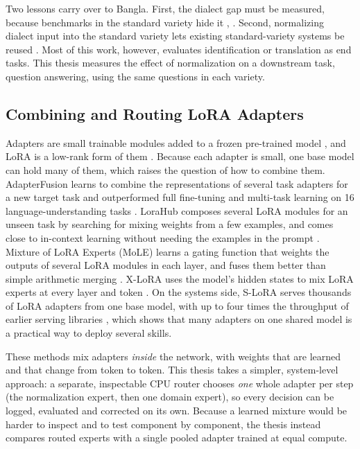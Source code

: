 Two lessons carry over to Bangla. First, the dialect gap must be
measured, because benchmarks in the standard variety hide it
\cite{faisal2024dialectbench}, \cite{kantharuban2023dialectgap}. Second,
normalizing dialect input into the standard variety lets existing
standard-variety systems be reused \cite{honnet2018swissgerman}. Most of
this work, however, evaluates identification or translation as end
tasks. This thesis measures the effect of normalization on a downstream
task, question answering, using the same questions in each variety.

\subsection{Combining and Routing LoRA Adapters}\label{combining-and-routing-lora-adapters}

Adapters are small trainable modules added to a frozen pre-trained model
\cite{houlsby2019adapters}, and LoRA is a low-rank form of them
\cite{hu2022lora}. Because each adapter is small, one base model can hold
many of them, which raises the question of how to combine them.
AdapterFusion learns to combine the representations of several
task adapters for a new target task and outperformed full fine-tuning
and multi-task learning on 16 language-understanding tasks
\cite{pfeiffer2021adapterfusion}. LoraHub composes several LoRA modules
for an unseen task by searching for mixing weights from a few examples,
and comes close to in-context learning without needing the examples in
the prompt \cite{huang2024lorahub}. Mixture of LoRA Experts (MoLE) learns a
gating function that weights the outputs of several LoRA modules in each
layer, and fuses them better than simple arithmetic merging
\cite{wu2024mole}. X-LoRA uses the model's hidden states to mix LoRA
experts at every layer and token \cite{buehler2024xlora}. On the systems side,
S-LoRA serves thousands of LoRA adapters from one base model, with up to
four times the throughput of earlier serving libraries
\cite{sheng2024slora}, which shows that many adapters on one shared model
is a practical way to deploy several skills.

These methods mix adapters \emph{inside} the network, with weights that
are learned and that change from token to token. This thesis takes a
simpler, system-level approach: a separate, inspectable CPU router
chooses \emph{one} whole adapter per step (the normalization expert, then
one domain expert), so every decision can be logged, evaluated and
corrected on its own. Because a learned mixture would be harder to
inspect and to test component by component, the thesis instead compares
routed experts with a single pooled adapter trained at equal compute.


